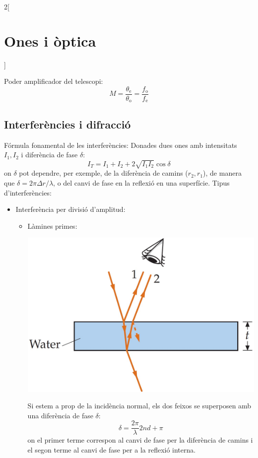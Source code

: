 \documentclass[class=article,10pt,crop=false]{standalone}
\begin{document}
\begin{multicols}{2}[\section{Ones i òptica}]
\begin{minipage}{\linewidth}
\end{minipage}
Poder amplificador del telescopi: $$M=\frac{\theta_\text{e}}{\theta_\text{o}}=\frac{f_{\text{o}}}{f_{\text{e}}}$$
\subsection{Interferències i difracció}
Fórmula fonamental de les interferències: Donades dues ones amb intensitats $I_1,I_2$ i diferència de fase $\delta$: $$I_T=I_1+I_2+2\sqrt{I_1I_2}\cos\delta$$
{\footnotesize on $\delta$ pot dependre, per exemple, de la diferència de camins ($r_2,r_1$), de manera que $\delta=2\pi\Delta r/\lambda$, o del canvi de fase en la reflexió en una superfície.}\newline
Tipus d'interferències:
\begin{itemize}
    \item Interferència per divisió d'amplitud:
    \begin{itemize}
        \item Làmines primes:\newline
        \begin{minipage}{\linewidth}
           \centering \includegraphics[width=\linewidth]{Physics/1st/Waves_and_optics/Images/lamprim.jpg} 
        \end{minipage}
Si estem a prop de la incidència normal, els dos feixos se superposen amb una diferència de fase $\delta$: $$\delta=\frac{2\pi}{\lambda}2nd+\pi$$ {\footnotesize on el primer terme correspon al canvi de fase per la diferència de camins i el segon terme al canvi de fase per a la reflexió interna.}

\end{itemize}
\end{itemize}
\end{multicols}
\end{document}
